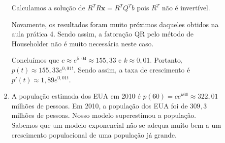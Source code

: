 \documentclass[11pt]{article}
\begin{document}
\begin{enumerate}
\begin{enumerate}[label=\arabic*)]
\begin{enumerate}[label=\alph*)]
                    Calculamos a solução de $R^TR\mathbf{x} = R^TQ^Tb$ pois $R^T$ não é invertível.
                    
                    Novamente, os resultados foram muito próximos daqueles obtidos na aula prática 4. Sendo assim, a fatoração QR pelo método de Householder não é muito necessária neste caso.
                    
                    Concluímos que $c \approx e^{5,04} \approx 155,33$ e $k \approx 0,01$. Portanto, $p(t)\approx155,33e^{0,01t}$. Sendo assim, a taxa de crescimento é $p'(t) \approx 1,89e^{0,01t}$.
                    \bigbreak
                    \item A população estimada dos EUA em 2010 é $p(60) = ce^{k60} \approx 322,01$ milhões de pessoas. Em 2010, a população dos EUA foi de $309,3$ milhões de pessoas. Nosso modelo superestimou a população. Sabemos que um modelo exponencial não se adequa muito bem a um crescimento populacional de uma população já grande.
                    \bigbreak
                    
                \end{enumerate}
                
            \end{enumerate}
        
        
    \end{enumerate}
\end{document}
